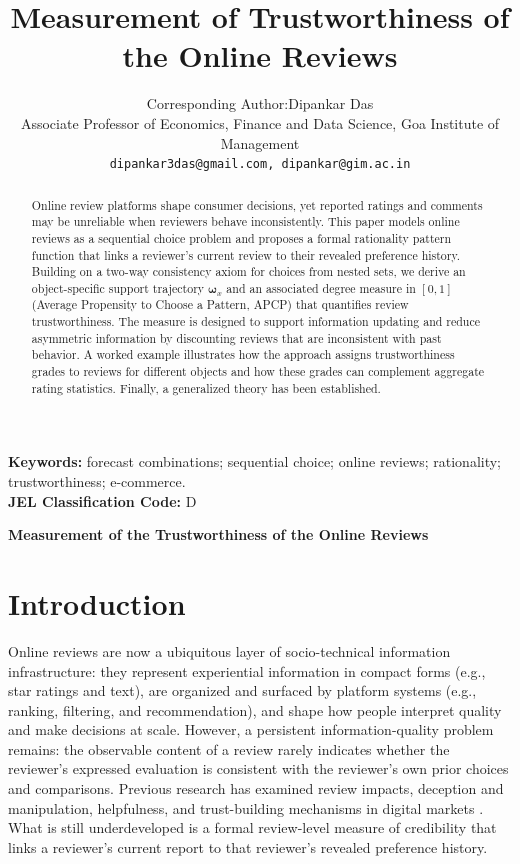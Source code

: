 \documentclass[conference]{IEEEtran}
\title{Measurement of Trustworthiness of the Online Reviews}
\author{Corresponding Author:Dipankar Das \\Associate Professor of Economics, Finance and Data Science, Goa Institute of Management \\\texttt{dipankar3das@gmail.com, dipankar@gim.ac.in}
}
\date{}
\theoremstyle{plain}
\theoremstyle{definition}
\theoremstyle{remark}
\begin{document}
	\maketitle
	\begin{abstract}
		Online review platforms shape consumer decisions, yet reported ratings and comments may be unreliable when reviewers behave inconsistently. This paper models online reviews as a sequential choice problem and proposes a formal rationality pattern function that links a reviewer's current review to their revealed preference history. Building on a two-way consistency axiom for choices from nested sets, we derive an object-specific support trajectory $\boldsymbol\omega_x$ and an associated degree measure in $[0,1]$ (Average Propensity to Choose a Pattern, APCP) that quantifies review trustworthiness. The measure is designed to support information updating and reduce asymmetric information by discounting reviews that are inconsistent with past behavior. A worked example illustrates how the approach assigns trustworthiness grades to reviews for different objects and how these grades can complement aggregate rating statistics. Finally, a generalized theory has been established.
	\end{abstract}

	\textbf{Keywords:} forecast combinations; sequential choice; online reviews; rationality; trustworthiness; e-commerce.\\
	\textbf{JEL Classification Code:} D	
	\begin{center}
		\textbf{Measurement of the Trustworthiness of the Online Reviews}
	\end{center}
	\section{Introduction}
    Online reviews are now a ubiquitous layer of socio-technical information infrastructure: they represent experiential information in compact forms (e.g., star ratings and text), are organized and surfaced by platform systems (e.g., ranking, filtering, and recommendation), and shape how people interpret quality and make decisions at scale. However, a persistent information-quality problem remains: the observable content of a review rarely indicates whether the reviewer’s expressed evaluation is consistent with the reviewer's own prior choices and comparisons. Previous research has examined review impacts, deception and manipulation, helpfulness, and trust-building mechanisms in digital markets \citep{huang2006herding,chen2017should,filieri2016makes,racherla2012perceived,utz2012consumers,song2020effect,qin2022integrated,punetha2023bayesian}. What is still underdeveloped is a formal review-level measure of credibility that links a reviewer’s current report to that reviewer’s revealed preference history.
\end{document}
